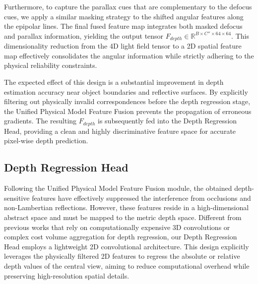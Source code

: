 \documentclass[lettersize,journal]{IEEEtran}
\begin{document}
Furthermore, to capture the parallax cues that are complementary to the defocus cues, we apply a similar masking strategy to the shifted angular features along the epipolar lines. The final fused feature map integrates both masked defocus and parallax information, yielding the output tensor $F_{depth} \in \mathbb{R}^{B \times C'' \times 64 \times 64}$. This dimensionality reduction from the 4D light field tensor to a 2D spatial feature map effectively consolidates the angular information while strictly adhering to the physical reliability constraints. 

The expected effect of this design is a substantial improvement in depth estimation accuracy near object boundaries and reflective surfaces. By explicitly filtering out physically invalid correspondences before the depth regression stage, the Unified Physical Model Feature Fusion prevents the propagation of erroneous gradients. The resulting $F_{depth}$ is subsequently fed into the Depth Regression Head, providing a clean and highly discriminative feature space for accurate pixel-wise depth prediction.

\subsection{Depth Regression Head}

Following the Unified Physical Model Feature Fusion module, the obtained depth-sensitive features have effectively suppressed the interference from occlusions and non-Lambertian reflections. However, these features reside in a high-dimensional abstract space and must be mapped to the metric depth space. Different from previous works that rely on computationally expensive 3D convolutions or complex cost volume aggregation for depth regression, our Depth Regression Head employs a lightweight 2D convolutional architecture. This design explicitly leverages the physically filtered 2D features to regress the absolute or relative depth values of the central view, aiming to reduce computational overhead while preserving high-resolution spatial details.
\end{document}
